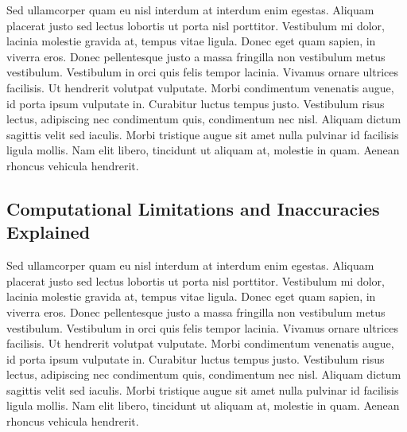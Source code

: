 Sed ullamcorper quam eu nisl interdum at interdum enim egestas. Aliquam placerat justo sed lectus lobortis ut porta nisl porttitor. Vestibulum mi dolor, lacinia molestie gravida at, tempus vitae ligula. Donec eget quam sapien, in viverra eros. Donec pellentesque justo a massa fringilla non vestibulum metus vestibulum. Vestibulum in orci quis felis tempor lacinia. Vivamus ornare ultrices facilisis. Ut hendrerit volutpat vulputate. Morbi condimentum venenatis augue, id porta ipsum vulputate in. Curabitur luctus tempus justo. Vestibulum risus lectus, adipiscing nec condimentum quis, condimentum nec nisl. Aliquam dictum sagittis velit sed iaculis. Morbi tristique augue sit amet nulla pulvinar id facilisis ligula mollis. Nam elit libero, tincidunt ut aliquam at, molestie in quam. Aenean rhoncus vehicula hendrerit.


\subsection{Computational Limitations and Inaccuracies Explained}

Sed ullamcorper quam eu nisl interdum at interdum enim egestas. Aliquam placerat justo sed lectus lobortis ut porta nisl porttitor. Vestibulum mi dolor, lacinia molestie gravida at, tempus vitae ligula. Donec eget quam sapien, in viverra eros. Donec pellentesque justo a massa fringilla non vestibulum metus vestibulum. Vestibulum in orci quis felis tempor lacinia. Vivamus ornare ultrices facilisis. Ut hendrerit volutpat vulputate. Morbi condimentum venenatis augue, id porta ipsum vulputate in. Curabitur luctus tempus justo. Vestibulum risus lectus, adipiscing nec condimentum quis, condimentum nec nisl. Aliquam dictum sagittis velit sed iaculis. Morbi tristique augue sit amet nulla pulvinar id facilisis ligula mollis. Nam elit libero, tincidunt ut aliquam at, molestie in quam. Aenean rhoncus vehicula hendrerit.
